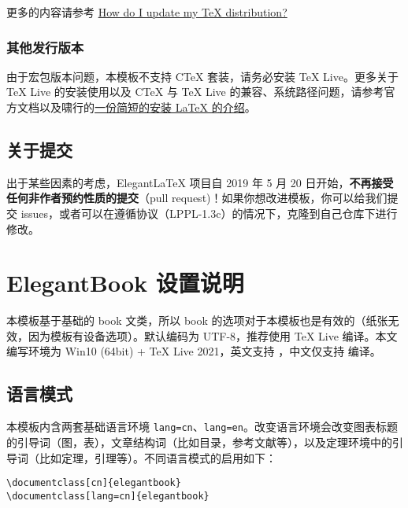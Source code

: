 \documentclass[cn,10pt,math=newtx,citestyle=gb7714-2015,bibstyle=gb7714-2015]{elegantbook}
\begin{document}
更多的内容请参考 \href{https://tex.stackexchange.com/questions/55437/how-do-i-update-my-tex-distribution}{How do I update my \TeX{} distribution?}

\subsection{其他发行版本}

由于宏包版本问题，本模板不支持 C\TeX{} 套装，请务必安装 TeX Live。更多关于 \TeX{} Live 的安装使用以及 C\TeX{} 与 \TeX{} Live 的兼容、系统路径问题，请参考官方文档以及啸行的\href{https://github.com/OsbertWang/install_latex/releases}{一份简短的安装 \LaTeX{} 的介绍}。


\section{关于提交}

出于某些因素的考虑，Elegant\LaTeX{} 项目自 2019 年 5 月 20 日开始，\textbf{不再接受任何非作者预约性质的提交}（pull request)！如果你想改进模板，你可以给我们提交 issues，或者可以在遵循协议（LPPL-1.3c）的情况下，克隆到自己仓库下进行修改。


\chapter{ElegantBook 设置说明}

本模板基于基础的 book 文类，所以 book 的选项对于本模板也是有效的（纸张无效，因为模板有设备选项）。默认编码为 UTF-8，推荐使用 \TeX{} Live 编译。本文编写环境为 Win10 (64bit) + \TeX{} Live 2021，英文支持 ，中文仅支持  编译。

\section{语言模式}
本模板内含两套基础语言环境 \lstinline{lang=cn}、\lstinline{lang=en}。改变语言环境会改变图表标题的引导词（图，表），文章结构词（比如目录，参考文献等），以及定理环境中的引导词（比如定理，引理等）。不同语言模式的启用如下：
\begin{lstlisting}
\documentclass[cn]{elegantbook} 
\documentclass[lang=cn]{elegantbook}
\end{lstlisting}
\end{document}
